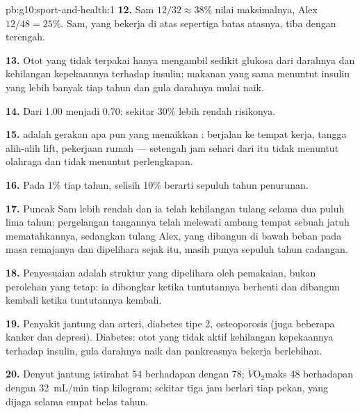 \begin{solution}{pb:g10:sport-and-health:1}
\textbf{12.} Sam $12/32 \approx 38\%$ nilai maksimalnya, Alex $12/48 =
25\%$. Sam, yang bekerja di atas sepertiga batas atasnya, tiba dengan terengah.

\textbf{13.} Otot yang tidak terpakai hanya mengambil sedikit glukosa
dari darahnya dan kehilangan kepekaannya terhadap insulin; makanan yang
sama menuntut insulin yang lebih banyak tiap tahun dan gula darahnya
mulai naik.

\textbf{14.} Dari 1.00 menjadi 0.70: sekitar 30\% lebih rendah risikonya.

\textbf{15.}  adalah gerakan apa pun yang menaikkan
: berjalan ke tempat kerja, tangga alih-alih lift,
pekerjaan rumah --- setengah jam sehari dari itu tidak menuntut
olahraga dan tidak menuntut perlengkapan.

\textbf{16.} Pada 1\% tiap tahun, selisih 10\% berarti sepuluh tahun
penurunan.

\textbf{17.} Puncak Sam lebih rendah dan ia telah kehilangan tulang
selama dua puluh lima tahun; pergelangan tangannya telah melewati ambang
tempat sebuah jatuh mematahkannya, sedangkan tulang Alex, yang dibangun
di bawah beban pada masa remajanya dan dipelihara sejak itu, masih
punya sepuluh tahun cadangan.

\textbf{18.} Penyesuaian adalah struktur yang dipelihara oleh
pemakaian, bukan perolehan yang tetap: ia dibongkar ketika tuntutannya
berhenti dan dibangun kembali ketika tuntutannya kembali.

\textbf{19.} Penyakit jantung dan arteri, diabetes tipe 2, osteoporosis
(juga beberapa kanker dan depresi). Diabetes: otot yang tidak aktif
kehilangan kepekaannya terhadap insulin, gula darahnya naik dan
pankreasnya bekerja berlebihan.

\textbf{20.} Denyut jantung istirahat 54 berhadapan dengan 78;
$\dot V\!\mathrm{O_2}$maks \num{48} berhadapan dengan \qty{32}{mL/min}
tiap kilogram; sekitar tiga jam berlari tiap pekan, yang dijaga selama
empat belas tahun.
\end{solution}
